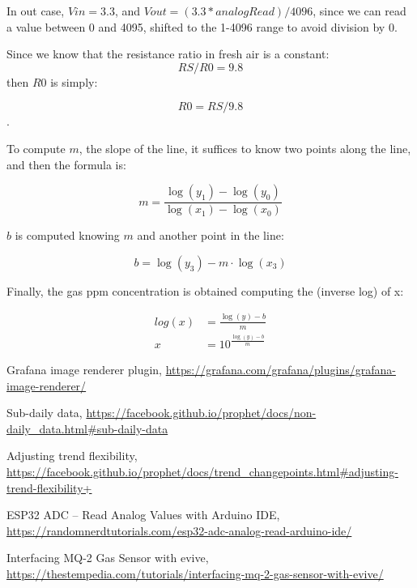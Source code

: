 \documentclass[]{article}
\begin{document}
In out case, $ Vin = 3.3 $, and $ Vout = (3.3*analogRead)/4096 $, since we can read a value between 0 and 4095, shifted to the 1-4096 range to avoid division by 0. 

Since we know that the resistance ratio in fresh air is a constant: 
$$RS / R0 = 9.8$$
then $ R0 $ is simply:

$$ R0 = RS / 9.8 $$.

To compute $ m $, the slope of the line, it suffices to know two points along the line, and then the formula is:

$$ m = \frac{\log(y_1) - \log(y_0)} {\log(x_1) - \log(x_0)} $$

$ b $ is computed knowing $ m $ and another point in the line:

$$ b = \log(y_3) - m \cdot \log(x_3) $$

Finally, the gas ppm concentration is obtained computing the (inverse log) of x:

\begin{align*}
	log(x) & = 	\frac{\log(y) - b}{m} \\
	x &  = 10 ^ {\frac{\log(y) - b } {m}}
\end{align*}

\begin{thebibliography}{9}
	
	 Grafana image renderer plugin, \url{https://grafana.com/grafana/plugins/grafana-image-renderer/}
	
	 Sub-daily data, \url{https://facebook.github.io/prophet/docs/non-daily_data.html#sub-daily-data}
	
	 Adjusting trend flexibility, \url{https://facebook.github.io/prophet/docs/trend_changepoints.html#adjusting-trend-flexibility+}
	
	 ESP32 ADC – Read Analog Values with Arduino IDE,  \url{https://randomnerdtutorials.com/esp32-adc-analog-read-arduino-ide/}
	
	 Interfacing MQ-2 Gas Sensor with evive,  \url{https://thestempedia.com/tutorials/interfacing-mq-2-gas-sensor-with-evive/}
	
\end{thebibliography}
\end{document}
